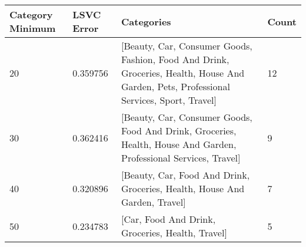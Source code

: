 \begin{tabular}{p{2cm}|p{1.7cm}|p{7.5cm}|p{1.4cm}}
\toprule
 Category Minimum &    LSVC Error &                                                                                                                              Categories &  Count \\
\midrule
               20 & 0.359756 & [Beauty, Car, Consumer Goods, Fashion, Food And Drink, Groceries, Health, House And Garden, Pets, Professional Services, Sport, Travel] &     12 \\
               30 & 0.362416 &                       [Beauty, Car, Consumer Goods, Food And Drink, Groceries, Health, House And Garden, Professional Services, Travel] &      9 \\
               40 & 0.320896 &                                                              [Beauty, Car, Food And Drink, Groceries, Health, House And Garden, Travel] &      7 \\
               50 & 0.234783 &                                                                                        [Car, Food And Drink, Groceries, Health, Travel] &      5 \\
\bottomrule
\end{tabular}
